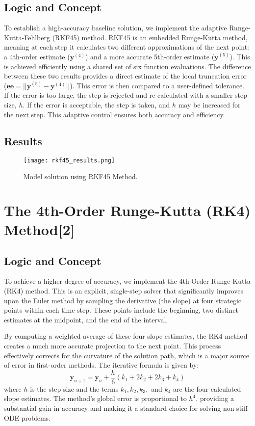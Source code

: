 \documentclass[conference]{IEEEtran}
\begin{document}
\subsection{Logic and Concept}
To establish a high-accuracy baseline solution, we implement the adaptive Runge-Kutta-Fehlberg (RKF45) method. RKF45 is an embedded Runge-Kutta method, meaning at each step it calculates two different approximations of the next point: a 4th-order estimate ($\mathbf{y}^{(4)}$) and a more accurate 5th-order estimate ($\mathbf{y}^{(5)}$). This is achieved efficiently using a shared set of six function evaluations. The difference between these two results provides a direct estimate of the local truncation error ($\mathbf{ee} = ||\mathbf{y}^{(5)} - \mathbf{y}^{(4)}||$). This error is then compared to a user-defined tolerance. If the error is too large, the step is rejected and re-calculated with a smaller step size, $h$. If the error is acceptable, the step is taken, and $h$ may be increased for the next step. This adaptive control ensures both accuracy and efficiency.

\subsection{Results}
\begin{figure}[htp]
\centerline{\texttt{[image: rkf45\_results.png]}}
\caption{Model solution using RKF45 Method.}
\label{fig:rkf45}
\end{figure}

\section{The 4th-Order Runge-Kutta (RK4) Method[2]}
\subsection{Logic and Concept}
To achieve a higher degree of accuracy, we implement the 4th-Order Runge-Kutta (RK4) method. This is an explicit, single-step solver that significantly improves upon the Euler method by sampling the derivative (the slope) at four strategic points within each time step. These points include the beginning, two distinct estimates at the midpoint, and the end of the interval.

By computing a weighted average of these four slope estimates, the RK4 method creates a much more accurate projection to the next point. This process effectively corrects for the curvature of the solution path, which is a major source of error in first-order methods. The iterative formula is given by:
\begin{equation}
    \mathbf{y}_{n+1} = \mathbf{y}_n + \frac{h}{6}(k_1 + 2k_2 + 2k_3 + k_4)
\end{equation}
where $h$ is the step size and the terms $k_1, k_2, k_3,$ and $k_4$ are the four calculated slope estimates. The method's global error is proportional to $h^4$, providing a substantial gain in accuracy and making it a standard choice for solving non-stiff ODE problems.
\end{document}
